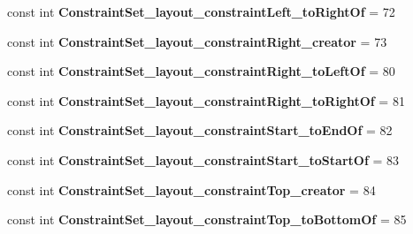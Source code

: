 \begin{DoxyCompactItemize}
const int {\bfseries Constraint\+Set\+\_\+layout\+\_\+constraint\+Left\+\_\+to\+Right\+Of} = 72
\item 
\mbox{\label{classst_delivery_1_1_resource_1_1_styleable_a41ea9110b3c73a363946e6a150984efc}} 
const int {\bfseries Constraint\+Set\+\_\+layout\+\_\+constraint\+Right\+\_\+creator} = 73
\item 
\mbox{\label{classst_delivery_1_1_resource_1_1_styleable_ac174a9c71995d52365d8a38fa6308d02}} 
const int {\bfseries Constraint\+Set\+\_\+layout\+\_\+constraint\+Right\+\_\+to\+Left\+Of} = 80
\item 
\mbox{\label{classst_delivery_1_1_resource_1_1_styleable_a72b072b83ec26456e0a2ffaaa6a722dd}} 
const int {\bfseries Constraint\+Set\+\_\+layout\+\_\+constraint\+Right\+\_\+to\+Right\+Of} = 81
\item 
\mbox{\label{classst_delivery_1_1_resource_1_1_styleable_acb389322e9c696748027fbae1478e147}} 
const int {\bfseries Constraint\+Set\+\_\+layout\+\_\+constraint\+Start\+\_\+to\+End\+Of} = 82
\item 
\mbox{\label{classst_delivery_1_1_resource_1_1_styleable_a174d136aa2d46c6e60dc26e6fcef3b72}} 
const int {\bfseries Constraint\+Set\+\_\+layout\+\_\+constraint\+Start\+\_\+to\+Start\+Of} = 83
\item 
\mbox{\label{classst_delivery_1_1_resource_1_1_styleable_ac9de3e1cdc4f613f0a465d39215a6e24}} 
const int {\bfseries Constraint\+Set\+\_\+layout\+\_\+constraint\+Top\+\_\+creator} = 84
\item 
\mbox{\label{classst_delivery_1_1_resource_1_1_styleable_a0530d91ee4422cad27eb2d9f12eb6581}} 
const int {\bfseries Constraint\+Set\+\_\+layout\+\_\+constraint\+Top\+\_\+to\+Bottom\+Of} = 85
\item 
\mbox{\label{classst_delivery_1_1_resource_1_1_styleable_aaa4e3e20b98b8d7a11c3123d2c67f474}} 

\end{DoxyCompactItemize}
